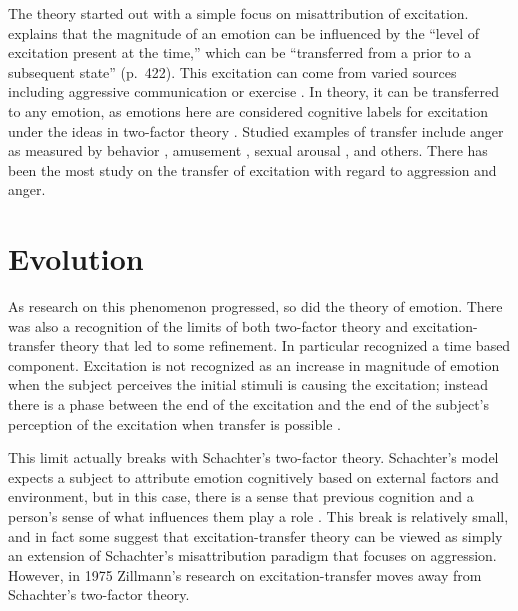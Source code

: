 \documentclass[
  stu,
  12pt]{apa7}
\begin{document}
The theory started out with a simple focus on misattribution of
excitation. \textcite{zilExcitationTransferCommunicationmediated}
explains that the magnitude of an emotion can be influenced by the
``level of excitation present at the time,'' which can be ``transferred
from a prior to a subsequent state'' (p.~422). This excitation can come
from varied sources including aggressive communication
\autocite{zilExcitationTransferCommunicationmediated} or exercise
\autocite{zilExcitationTransferPhysical}. In theory, it can be
transferred to any emotion, as emotions here are considered cognitive
labels for excitation under the ideas in two-factor theory \autocite[
421]{zilExcitationTransferCommunicationmediated}. Studied examples of
transfer include anger as measured by behavior
\autocite{zilExcitationTransferCommunicationmediated}, amusement
\autocite{canEnhancementHumorAppreciation}, sexual arousal
\autocite{canEnhancementExperiencedSexual}, and others. There has been
the most study on the transfer of excitation with regard to aggression
and anger.

\hypertarget{evolution}{%
\section{Evolution}\label{evolution}}

As research on this phenomenon progressed, so did the theory of emotion.
There was also a recognition of the limits of both two-factor theory and
excitation-transfer theory that led to some refinement. In particular
\textcite{canEnhancementExperiencedSexual} recognized a time based
component. Excitation is not recognized as an increase in magnitude of
emotion when the subject perceives the initial stimuli is causing the
excitation; instead there is a phase between the end of the excitation
and the end of the subject's perception of the excitation when transfer
is possible \autocite{canEnhancementExperiencedSexual}.

This limit actually breaks with Schachter's two-factor theory.
Schachter's model expects a subject to attribute emotion cognitively
based on external factors and environment, but in this case, there is a
sense that previous cognition and a person's sense of what influences
them play a role \autocite[ 40]{bryExcitationTransferTheoryThreeFactor}.
This break is relatively small, and in fact some
\autocite{cotReviewResearchSchachter} suggest that excitation-transfer
theory can be viewed as simply an extension of Schachter's
misattribution paradigm that focuses on aggression. However, in 1975
Zillmann's research on excitation-transfer moves away from Schachter's
two-factor theory.
\end{document}
